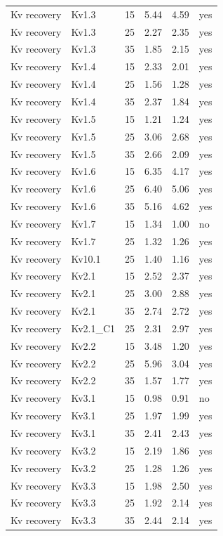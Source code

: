 \begin{longtable}{lllrrl}
Kv recovery & Kv1.3 & 15 & 5.44 & 4.59 & yes \\
Kv recovery & Kv1.3 & 25 & 2.27 & 2.35 & yes \\
Kv recovery & Kv1.3 & 35 & 1.85 & 2.15 & yes \\
Kv recovery & Kv1.4 & 15 & 2.33 & 2.01 & yes \\
Kv recovery & Kv1.4 & 25 & 1.56 & 1.28 & yes \\
Kv recovery & Kv1.4 & 35 & 2.37 & 1.84 & yes \\
Kv recovery & Kv1.5 & 15 & 1.21 & 1.24 & yes \\
Kv recovery & Kv1.5 & 25 & 3.06 & 2.68 & yes \\
Kv recovery & Kv1.5 & 35 & 2.66 & 2.09 & yes \\
Kv recovery & Kv1.6 & 15 & 6.35 & 4.17 & yes \\
Kv recovery & Kv1.6 & 25 & 6.40 & 5.06 & yes \\
Kv recovery & Kv1.6 & 35 & 5.16 & 4.62 & yes \\
Kv recovery & Kv1.7 & 15 & 1.34 & 1.00 & no \\
Kv recovery & Kv1.7 & 25 & 1.32 & 1.26 & yes \\
Kv recovery & Kv10.1 & 25 & 1.40 & 1.16 & yes \\
Kv recovery & Kv2.1 & 15 & 2.52 & 2.37 & yes \\
Kv recovery & Kv2.1 & 25 & 3.00 & 2.88 & yes \\
Kv recovery & Kv2.1 & 35 & 2.74 & 2.72 & yes \\
Kv recovery & Kv2.1\_C1 & 25 & 2.31 & 2.97 & yes \\
Kv recovery & Kv2.2 & 15 & 3.48 & 1.20 & yes \\
Kv recovery & Kv2.2 & 25 & 5.96 & 3.04 & yes \\
Kv recovery & Kv2.2 & 35 & 1.57 & 1.77 & yes \\
Kv recovery & Kv3.1 & 15 & 0.98 & 0.91 & no \\
Kv recovery & Kv3.1 & 25 & 1.97 & 1.99 & yes \\
Kv recovery & Kv3.1 & 35 & 2.41 & 2.43 & yes \\
Kv recovery & Kv3.2 & 15 & 2.19 & 1.86 & yes \\
Kv recovery & Kv3.2 & 25 & 1.28 & 1.26 & yes \\
Kv recovery & Kv3.3 & 15 & 1.98 & 2.50 & yes \\
Kv recovery & Kv3.3 & 25 & 1.92 & 2.14 & yes \\
Kv recovery & Kv3.3 & 35 & 2.44 & 2.14 & yes \\

\end{longtable}
